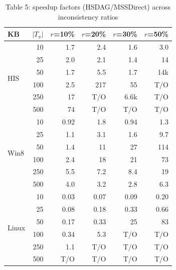 \begin{table}[htbp]
\centering
\scriptsize
\begin{tabular}{|l|r|rrrr|}
\hline
KB & $|T_\pi|$ & $r$=10\% & $r$=20\% & $r$=30\% & $r$=50\% \\
\hline
\multirow{6}{*}{HIS} & 10 & 1.7 & 2.4 & 1.6 & 3.0 \\
 & 25 & 2.0 & 2.1 & 1.4 & 14 \\
 & 50 & 1.7 & 5.5 & 1.7 & 14k \\
 & 100 & 2.5 & 217 & 55 & T/O \\
 & 250 & 17 & T/O & 6.6k & T/O \\
 & 500 & 74 & T/O & T/O & T/O \\
\hline
\multirow{6}{*}{Win8} & 10 & 0.92 & 1.8 & 0.94 & 1.3 \\
 & 25 & 1.1 & 3.1 & 1.6 & 9.7 \\
 & 50 & 1.4 & 11 & 27 & 114 \\
 & 100 & 2.4 & 18 & 21 & 73 \\
 & 250 & 5.5 & 7.2 & 8.4 & 19 \\
 & 500 & 4.0 & 3.2 & 2.8 & 6.3 \\
\hline
\multirow{6}{*}{Linux} & 10 & 0.03 & 0.07 & 0.09 & 0.20 \\
 & 25 & 0.08 & 0.18 & 0.33 & 0.66 \\
 & 50 & 0.17 & 0.33 & 25 & 83 \\
 & 100 & 0.34 & 5.3 & T/O & T/O \\
 & 250 & 1.1 & T/O & T/O & T/O \\
 & 500 & T/O & T/O & T/O & T/O \\
\hline
\end{tabular}
\caption{Table 5: speedup factors (HSDAG/MSSDirect) across inconsistency ratios}
\label{tab:table5}
\end{table}
